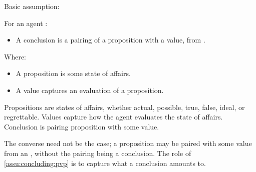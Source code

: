 \begin{note}
  Basic assumption:

  \begin{assumption}
    \label{assu:concluding:pvp}
    For an agent \vAgent{}:

    \begin{itemize}
    \item
      A conclusion is a pairing of a proposition with a value, from .
    \end{itemize}

    Where:
    \begin{itemize}[noitemsep]
    \item
      A proposition is some state of affairs.
    \item
      A value captures an evaluation of a proposition.
    \end{itemize}
  \end{assumption}

  Propositions are states of affairs, whether actual, possible, true, false, ideal, or regrettable.
  Values capture how the agent evaluates the state of affairs.
  Conclusion is pairing proposition with some value.

  The converse need not be the case; a proposition may be paired with some value from an \agpe{}, without the pairing being a conclusion.
  The role of \autoref{assu:concluding:pvp} is to capture what a conclusion amounts to.
\end{note}

